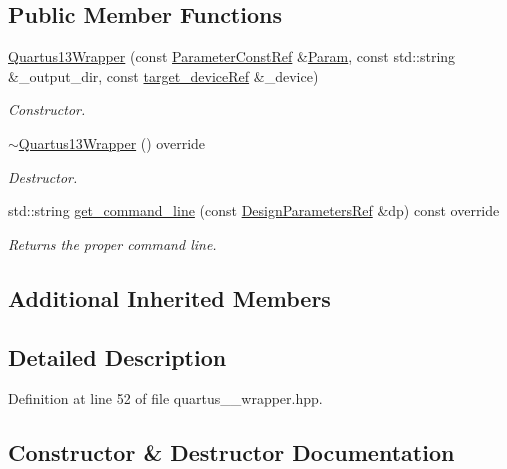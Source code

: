 \subsection*{Public Member Functions}
\begin{DoxyCompactItemize}
\item 
\hyperlink{classQuartus13Wrapper_a49840070270684a80499f67fa67c05b7}{Quartus13\+Wrapper} (const \hyperlink{Parameter_8hpp_a37841774a6fcb479b597fdf8955eb4ea}{Parameter\+Const\+Ref} \&\hyperlink{classSynthesisTool_a854ef102782ff4d069e1aa6d1a94d64e}{Param}, const std\+::string \&\+\_\+output\+\_\+dir, const \hyperlink{target__device_8hpp_acedb2b7a617e27e6354a8049fee44eda}{target\+\_\+device\+Ref} \&\+\_\+device)
\begin{DoxyCompactList}\small\item\em Constructor. \end{DoxyCompactList}\item 
\hyperlink{classQuartus13Wrapper_ac564cc57b02762aae682a61162c8e525}{$\sim$\+Quartus13\+Wrapper} () override
\begin{DoxyCompactList}\small\item\em Destructor. \end{DoxyCompactList}\item 
std\+::string \hyperlink{classQuartus13Wrapper_aa3d9af79c6ebd372589c482dd6fc3eab}{get\+\_\+command\+\_\+line} (const \hyperlink{DesignParameters_8hpp_ae36bb1c4c9150d0eeecfe1f96f42d157}{Design\+Parameters\+Ref} \&dp) const override
\begin{DoxyCompactList}\small\item\em Returns the proper command line. \end{DoxyCompactList}\end{DoxyCompactItemize}
\subsection*{Additional Inherited Members}


\subsection{Detailed Description}


Definition at line 52 of file quartus\+\_\+\_\+wrapper.\+hpp.



\subsection{Constructor \& Destructor Documentation}
\mbox{\label{classQuartus13Wrapper_a49840070270684a80499f67fa67c05b7}} 
